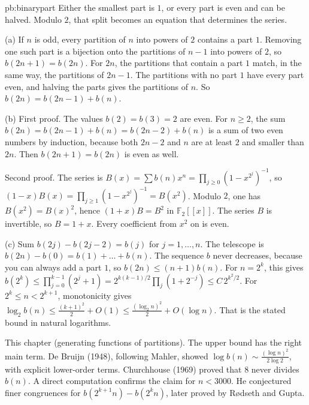 \begin{solution}{pb:binarypart}
\idea Either the smallest part is $1$, or every part is even and can be halved. Modulo $2$, that split becomes an equation that determines the series.

\writeup (a) If $n$ is odd, every partition of $n$ into powers of $2$ contains a part $1$. Removing one such part is a bijection onto the
partitions of $n-1$ into powers of $2$, so $b(2n+1)=b(2n)$. For $2n$, the partitions that contain a part $1$ match, in the same way,
the partitions of $2n-1$. The partitions with no part $1$ have every part even, and halving the parts gives the partitions of $n$. So $b(2n)=b(2n-1)+b(n)$.

(b) First proof. The values $b(2)=b(3)=2$ are even. For $n\ge2$, the sum $b(2n)=b(2n-1)+b(n)=b(2n-2)+b(n)$ is a sum of two even numbers by induction, because both
$2n-2$ and $n$ are at least $2$ and smaller than $2n$. Then $b(2n+1)=b(2n)$ is even as well.

Second proof. The series is $B(x)=\sum b(n)x^n=\prod_{j\ge0}(1-x^{2^j})^{-1}$, so $(1-x)B(x)=\prod_{j\ge1}(1-x^{2^j})^{-1}=B(x^2)$. Modulo $2$, one has $B(x^2)=B(x)^2$, hence
$(1+x)B=B^2$ in $\mathbb F_2[[x]]$. The series $B$ is invertible, so $B=1+x$. Every coefficient from $x^2$ on is even.

(c) Sum $b(2j)-b(2j-2)=b(j)$ for $j=1,\dots,n$. The telescope is $b(2n)-b(0)=b(1)+\dots+b(n)$. The sequence $b$ never decreases, because you can always add a part
$1$, so $b(2n)\le(n+1)b(n)$. For $n=2^k$, this gives $b(2^k)\le\prod_{j=0}^{k-1}(2^j+1)=2^{k(k-1)/2}\prod_j(1+2^{-j})\le C\,2^{k^2/2}$. For
$2^k\le n<2^{k+1}$, monotonicity gives $\log_2b(n)\le\frac{(k+1)^2}2+O(1)\le\frac{(\log_2n)^2}2+O(\log n)$. That is the stated bound in
natural logarithms.

\tools This chapter (generating functions of partitions).
\leads The upper bound has the right main term. De Bruijn (1948), following Mahler, showed $\log b(n)\sim\frac{(\log n)^2}{2\log2}$,
with explicit lower-order terms. Churchhouse (1969) proved that $8$ never divides $b(n)$. A direct computation confirms the claim for $n<3000$. He conjectured finer congruences
for $b(2^{k+1}n)-b(2^kn)$, later proved by Rødseth and Gupta.
\end{solution}

